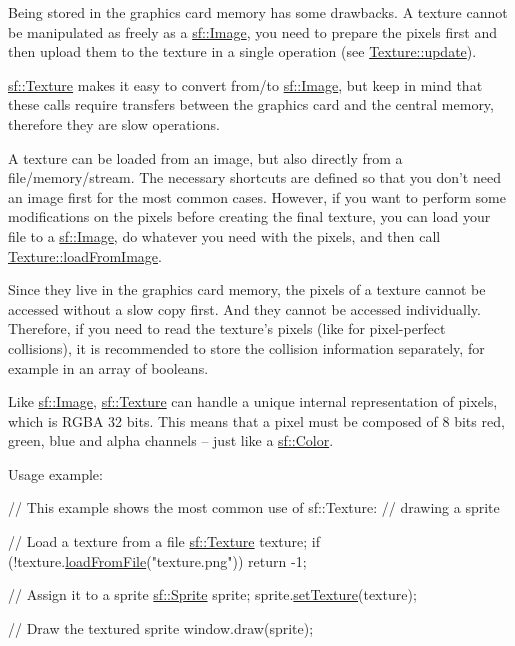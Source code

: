 Being stored in the graphics card memory has some drawbacks. A texture cannot be manipulated as freely as a \hyperlink{classsf_1_1_image}{sf\+::\+Image}, you need to prepare the pixels first and then upload them to the texture in a single operation (see \hyperlink{classsf_1_1_texture_ae4eab5c6781316840b0c50ad08370963}{Texture\+::update}).

\hyperlink{classsf_1_1_texture}{sf\+::\+Texture} makes it easy to convert from/to \hyperlink{classsf_1_1_image}{sf\+::\+Image}, but keep in mind that these calls require transfers between the graphics card and the central memory, therefore they are slow operations.

A texture can be loaded from an image, but also directly from a file/memory/stream. The necessary shortcuts are defined so that you don't need an image first for the most common cases. However, if you want to perform some modifications on the pixels before creating the final texture, you can load your file to a \hyperlink{classsf_1_1_image}{sf\+::\+Image}, do whatever you need with the pixels, and then call \hyperlink{classsf_1_1_texture_abec4567ad9856a3596dc74803f26fba2}{Texture\+::load\+From\+Image}.

Since they live in the graphics card memory, the pixels of a texture cannot be accessed without a slow copy first. And they cannot be accessed individually. Therefore, if you need to read the texture's pixels (like for pixel-\/perfect collisions), it is recommended to store the collision information separately, for example in an array of booleans.

Like \hyperlink{classsf_1_1_image}{sf\+::\+Image}, \hyperlink{classsf_1_1_texture}{sf\+::\+Texture} can handle a unique internal representation of pixels, which is R\+G\+B\+A 32 bits. This means that a pixel must be composed of 8 bits red, green, blue and alpha channels -- just like a \hyperlink{classsf_1_1_color}{sf\+::\+Color}.

Usage example\+: 
\begin{DoxyCode}
\textcolor{comment}{// This example shows the most common use of sf::Texture:}
\textcolor{comment}{// drawing a sprite}

\textcolor{comment}{// Load a texture from a file}
\hyperlink{classsf_1_1_texture}{sf::Texture} texture;
\textcolor{keywordflow}{if} (!texture.\hyperlink{classsf_1_1_texture_a8e1b56eabfe33e2e0e1cb03712c7fcc7}{loadFromFile}(\textcolor{stringliteral}{"texture.png"}))
    \textcolor{keywordflow}{return} -1;

\textcolor{comment}{// Assign it to a sprite}
\hyperlink{classsf_1_1_sprite}{sf::Sprite} sprite;
sprite.\hyperlink{classsf_1_1_sprite_a3729c88d88ac38c19317c18e87242560}{setTexture}(texture);

\textcolor{comment}{// Draw the textured sprite}
window.draw(sprite);
\end{DoxyCode}



